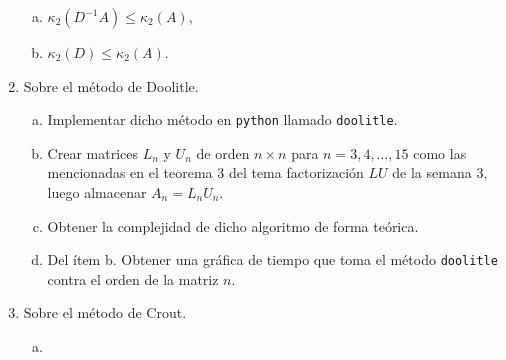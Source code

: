 \documentclass[
	spanish,
	9pt,
	utf8,
	xcolor=table,
	handout,
	aspectratio=1610,
	professionalfonts,
	notheorems,
	mathserif,
]{beamer}
\begin{document}
\begin{frame}
\begin{enumerate}
\begin{multicols}{3}
\begin{enumerate}[a)]
				      \item

				            \begin{math}
					            \kappa_{2}
					            \left(D^{-1}A\right)\leq
					            \kappa_{2}
					            \left(A\right)
				            \end{math},

				      \item

				            \begin{math}
					            \kappa_{2}
					            \left(D\right)\leq
					            \kappa_{2}
					            \left(A\right)
				            \end{math}.
			      \end{enumerate}
		      \end{multicols}

		\item
		      Sobre el método de Doolitle.

		      \begin{enumerate}[a)]

			      \item

			            Implementar dicho método en \texttt{python} llamado \texttt{doolitle}.

			      \item

			            Crear matrices $L_{n}$ y $U_{n}$ de orden $n\times n$ para $n=3,4,\dotsc,15$ como las mencionadas en el teorema $3$ del tema factorización $LU$ de la semana $3$, luego almacenar $A_{n}=L_{n}U_{n}$.

			      \item

			            Obtener la complejidad de dicho algoritmo de forma teórica.

			      \item

			            Del ítem b.
			            Obtener una gráfica de tiempo que toma el método \texttt{doolitle} contra el orden de la matriz $n$.
		      \end{enumerate}

		\item

		      Sobre el método de Crout.

		      \begin{enumerate}[a)]
			      \item


\end{enumerate}
\end{enumerate}
\end{frame}
\end{document}
